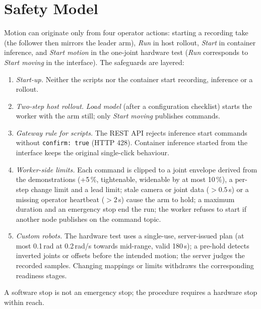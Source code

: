 \documentclass[conference]{IEEEtran}
\begin{document}
\section{Safety Model}\label{sec:safety}
Motion can originate only from four operator actions: starting a recording take (the follower
then mirrors the leader arm), \emph{Run} in host rollout, \emph{Start} in container inference,
and \emph{Start motion} in the one-joint hardware test (\emph{Run} corresponds to
\emph{Start moving} in the interface). The safeguards are layered:
\begin{enumerate}
\item \emph{Start-up.} Neither the scripts nor the container start recording, inference or a
rollout.
\item \emph{Two-step host rollout.} \emph{Load model} (after a configuration checklist) starts the
worker with the arm still; only \emph{Start moving} publishes commands.
\item \emph{Gateway rule for scripts.} The REST API rejects inference start commands without
\texttt{confirm: true} (HTTP 428). Container inference started from the interface keeps the
original single-click behaviour.
\item \emph{Worker-side limits.} Each command is clipped to a joint envelope derived from the
demonstrations (+5\,\%, tightenable, widenable by at most 10\,\%), a per-step change limit and
a lead limit; stale camera or joint data ($>0.5$\,s) or a missing operator heartbeat ($>2$\,s)
cause the arm to hold; a maximum duration and an emergency stop end the run; the worker refuses
to start if another node publishes on the command topic.
\item \emph{Custom robots.} The hardware test uses a single-use, server-issued plan (at most
0.1\,rad at 0.2\,rad/s towards mid-range, valid 180\,s); a pre-hold detects inverted joints or
offsets before the intended motion; the server judges the recorded samples. Changing mappings or
limits withdraws the corresponding readiness stages.
\end{enumerate}
A software stop is not an emergency stop; the procedure requires a hardware stop within reach.
\end{document}
